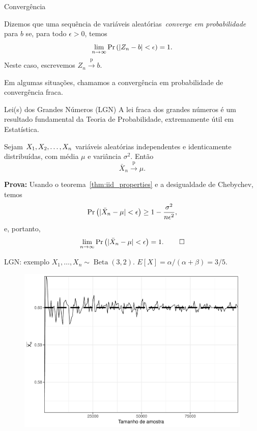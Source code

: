 \begin{frame}{Convergência}
\begin{defn}
\label{defn:weak_convergence}
Dizemos que uma sequência de variáveis aleatórias~\textit{converge em probabilidade} para $b$ se, para todo $\epsilon > 0$, temos
\begin{equation}
 \nonumber
 \lim_{n\to\infty} \operatorname{Pr}\left(|Z_n-b| < \epsilon \right) = 1.
\end{equation}
Neste caso, escrevemos $Z_n \xrightarrow{\text{p}} b$.
\end{defn}
Em algumas situações, chamamos a convergência em probabilidade de convergência fraca.
\end{frame}
\begin{frame}{Lei(s) dos Grandes Números (LGN)}
A lei fraca dos grandes números é um resultado fundamental da Teoria de Probabilidade, extremamente útil em Estatística.
\begin{theo}
\label{thm:WLLN}
Sejam  $X_1, X_2, \ldots, X_n$ variáveis aleatórias independentes e identicamente distribuídas, com média $\mu$ e variância $\sigma^2$.
 Então
 $$ \bar{X}_n \xrightarrow{\text{p}} \mu.$$
\end{theo}
\textbf{Prova:}
Usando o teorema~\ref{thm:iid_properties} e a desigualdade de Chebychev, temos
$$ \operatorname{Pr}\left( |\bar{X}_n - \mu| < \epsilon\right) \geq  1 - \frac{\sigma^2}{n\epsilon^2},$$
e, portanto,
$$ \lim_{n\to\infty} \operatorname{Pr}\left( |\bar{X}_n - \mu| < \epsilon\right) = 1. \: \qed$$
\end{frame}
\begin{frame}{LGN: exemplo}
$X_1, \ldots, X_n \sim \operatorname{Beta}(3, 2)$.
$E[X] = \alpha / (\alpha + \beta) = 3/5$.
\begin{figure}[!ht]
\label{fig:beta_LGN}
\begin{center}
\includegraphics[scale=0.35]{figures/beta_3_2_LGN.pdf} 
\end{center} 
\end{figure} 
\end{frame}
